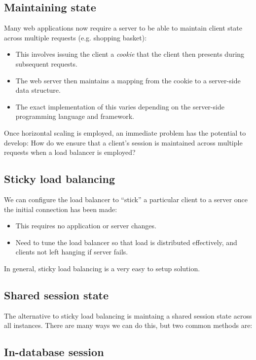 \documentclass[slides]{pgnotes}
\begin{document}
\subsection{Maintaining state}

Many web applications now require a server to be able to maintain client state across multiple requests (e.g. shopping basket):
\begin{itemize}
\item This involves issuing the client a \textit{cookie} that the client then presents during subsequent requests.
\item The web server then maintains a mapping from the cookie to a server-side data structure.
\item The exact implementation of this varies depending on the server-side programming language and framework. 
\end{itemize}
Once horizontal scaling is employed, an immediate problem has the potential to develop:
How do we ensure that a client's session is maintained across multiple requests when a load balancer is employed?


\subsection{Sticky load balancing}

We can configure the load balancer to ``stick'' a particular client to a server once the initial connection has been made:
\begin{itemize}
\item This requires no application or server changes.
\item Need to tune the load balancer so that load is distributed effectively, and clients not left hanging if server fails.
\end{itemize}

In general, sticky load balancing is a very easy to setup solution.

\newpage

\subsection{Shared session state}

The alternative to sticky load balancing is maintaing a shared session state across all instances.
There are many ways we can do this, but two common methods are: 

\subsection{In-database session}
\end{document}
